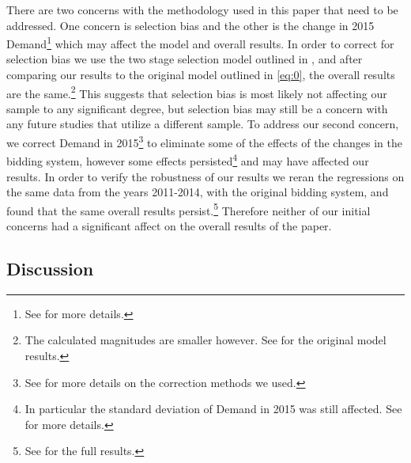 There are two concerns with the methodology used in this paper that need to be addressed.
One concern is selection bias and the other is the change in 2015 Demand\footnote{See  for more details.} which may affect the model and overall results.
In order to correct for selection bias we use the two stage selection model outlined in , and after comparing our results to the original model outlined in \eqref{eq:0}, the overall results are the same.\footnote{The calculated magnitudes are smaller however. See  for the original model results.} 
This suggests that selection bias is most likely not affecting our sample to any significant degree, but selection bias may still be a concern with any future studies that utilize a different sample.
To address our second concern, we correct Demand in 2015\footnote{See  for more details on the correction methods we used.} to eliminate some of the effects of the changes in the bidding system, however some effects persisted\footnote{In particular the standard deviation of Demand in 2015 was still affected. See  for more details.} and may have affected our results.
In order to verify the robustness of our results we reran the regressions on the same data from the years 2011-2014, with the original bidding system, and found that the same overall results persist.\footnote{See  for the full results.}
Therefore neither of our initial concerns had a significant affect on the overall results of the paper.

\subsection{Discussion}\label{results:discussion}

